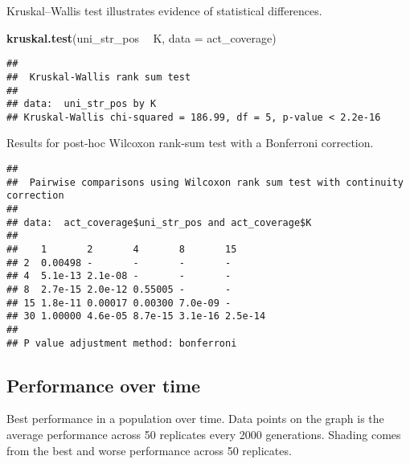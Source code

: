 \documentclass[]{book}
\newenvironment{Shaded}{\begin{snugshade}}{\end{snugshade}}
\newcommand{\DataTypeTok}[1]{\textcolor[rgb]{0.13,0.29,0.53}{#1}}
\newcommand{\KeywordTok}[1]{\textcolor[rgb]{0.13,0.29,0.53}{\textbf{#1}}}
\newcommand{\NormalTok}[1]{#1}
\newcommand{\OperatorTok}[1]{\textcolor[rgb]{0.81,0.36,0.00}{\textbf{#1}}}
\newcommand{\OtherTok}[1]{\textcolor[rgb]{0.56,0.35,0.01}{#1}}
\newcommand{\StringTok}[1]{\textcolor[rgb]{0.31,0.60,0.02}{#1}}
\begin{document}
Kruskal--Wallis test illustrates evidence of statistical differences.

\begin{Shaded}
\begin{Highlighting}[]
\KeywordTok{kruskal.test}\NormalTok{(uni_str_pos }\OperatorTok{~}\StringTok{ }\NormalTok{K, }\DataTypeTok{data =}\NormalTok{ act_coverage)}
\end{Highlighting}
\end{Shaded}

\begin{verbatim}
## 
##  Kruskal-Wallis rank sum test
## 
## data:  uni_str_pos by K
## Kruskal-Wallis chi-squared = 186.99, df = 5, p-value < 2.2e-16
\end{verbatim}

Results for post-hoc Wilcoxon rank-sum test with a Bonferroni correction.

\begin{Shaded}
\end{Shaded}

\begin{verbatim}
## 
##  Pairwise comparisons using Wilcoxon rank sum test with continuity correction 
## 
## data:  act_coverage$uni_str_pos and act_coverage$K 
## 
##    1       2       4       8       15     
## 2  0.00498 -       -       -       -      
## 4  5.1e-13 2.1e-08 -       -       -      
## 8  2.7e-15 2.0e-12 0.55005 -       -      
## 15 1.8e-11 0.00017 0.00300 7.0e-09 -      
## 30 1.00000 4.6e-05 8.7e-15 3.1e-16 2.5e-14
## 
## P value adjustment method: bonferroni
\end{verbatim}

\hypertarget{performance-over-time-17}{%
\subsection{Performance over time}\label{performance-over-time-17}}

Best performance in a population over time.
Data points on the graph is the average performance across 50 replicates every 2000 generations.
Shading comes from the best and worse performance across 50 replicates.
\end{document}
